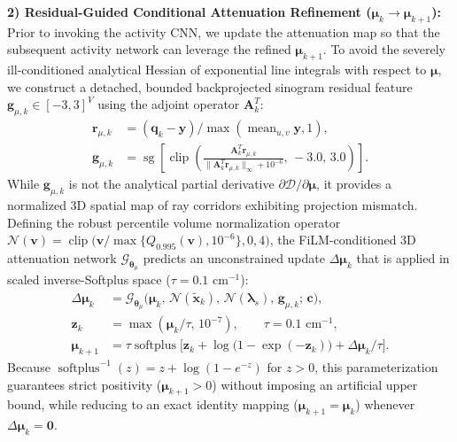 \documentclass[11pt, a4paper]{article}
\begin{document}
\textbf{2) Residual-Guided Conditional Attenuation Refinement ($\boldsymbol{\mu}_{k} \to \boldsymbol{\mu}_{k+1}$):} Prior to invoking the activity CNN, we update the attenuation map so that the subsequent activity network can leverage the refined $\boldsymbol{\mu}_{k+1}$. To avoid the severely ill-conditioned analytical Hessian of exponential line integrals with respect to $\boldsymbol{\mu}$, we construct a detached, bounded backprojected sinogram residual feature $\mathbf{g}_{\mu,k} \in [-3, 3]^V$ using the adjoint operator $\mathbf{A}_k^T$:
\begin{align}
\mathbf{r}_{\mu,k} &= (\mathbf{q}_k - \mathbf{y}) / \max(\operatorname{mean}_{u,v} \mathbf{y}, 1), \\
\mathbf{g}_{\mu,k} &= \operatorname{sg}\!\left[ \operatorname{clip}\!\left( \frac{\mathbf{A}_k^T \mathbf{r}_{\mu,k}}{\|\mathbf{A}_k^T \mathbf{r}_{\mu,k}\|_\infty + 10^{-6}}, \, -3.0, \, 3.0 \right) \right].
\end{align}
While $\mathbf{g}_{\mu,k}$ is not the analytical partial derivative $\partial \mathcal{D} / \partial \boldsymbol{\mu}$, it provides a normalized 3D spatial map of ray corridors exhibiting projection mismatch. Defining the robust percentile volume normalization operator $\mathcal{N}(\mathbf{v}) = \operatorname{clip}\big(\mathbf{v} / \max\{Q_{0.995}(\mathbf{v}), 10^{-6}\}, 0, 4\big)$, the FiLM-conditioned 3D attenuation network $\mathcal{G}_{\boldsymbol{\theta}_\mu}$ predicts an unconstrained update $\Delta \boldsymbol{\mu}_k$ that is applied in scaled inverse-Softplus space ($\tau = 0.1\text{ cm}^{-1}$):
\begin{align}
\Delta \boldsymbol{\mu}_k &= \mathcal{G}_{\boldsymbol{\theta}_\mu}\big(\boldsymbol{\mu}_k, \, \mathcal{N}(\widetilde{\mathbf{x}}_k), \, \mathcal{N}(\boldsymbol{\lambda}_s), \, \mathbf{g}_{\mu,k}; \, \mathbf{c}\big), \\
\mathbf{z}_k &= \max(\boldsymbol{\mu}_k / \tau, \, 10^{-7}), \qquad \tau = 0.1\text{ cm}^{-1}, \\
\boldsymbol{\mu}_{k+1} &= \tau \operatorname{softplus}\!\Big[ \mathbf{z}_k + \log\big(1 - \exp(-\mathbf{z}_k)\big) + \Delta \boldsymbol{\mu}_k / \tau \Big].
\end{align}
Because $\operatorname{softplus}^{-1}(z) = z + \log(1 - e^{-z})$ for $z > 0$, this parameterization guarantees strict positivity ($\boldsymbol{\mu}_{k+1} > 0$) without imposing an artificial upper bound, while reducing to an exact identity mapping ($\boldsymbol{\mu}_{k+1} = \boldsymbol{\mu}_k$) whenever $\Delta \boldsymbol{\mu}_k = \mathbf{0}$.
\end{document}

